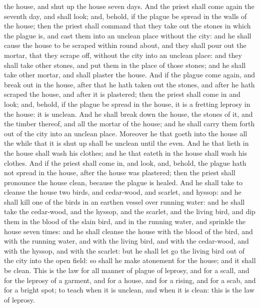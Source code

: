 the house, and shut up the house seven days. And the priest shall come again the seventh day, and shall look; and, behold, if the plague be spread in the walls of the house; then the priest shall command that they take out the stones in which the plague is, and cast them into an unclean place without the city: and he shall cause the house to be scraped within round about, and they shall pour out the mortar, that they scrape off, without the city into an unclean place: and they shall take other stones, and put them in the place of those stones; and he shall take other mortar, and shall plaster the house.  And if the plague come again, and break out in the house, after that he hath taken out the stones, and after he hath scraped the house, and after it is plastered; then the priest shall come in and look; and, behold, if the plague be spread in the house, it is a fretting leprosy in the house: it is unclean. And he shall break down the house, the stones of it, and the timber thereof, and all the mortar of the house; and he shall carry them forth out of the city into an unclean place. Moreover he that goeth into the house all the while that it is shut up shall be unclean until the even. And he that lieth in the house shall wash his clothes; and he that eateth in the house shall wash his clothes.  And if the priest shall come in, and look, and, behold, the plague hath not spread in the house, after the house was plastered; then the priest shall pronounce the house clean, because the plague is healed. And he shall take to cleanse the house two birds, and cedar-wood, and scarlet, and hyssop: and he shall kill one of the birds in an earthen vessel over running water: and he shall take the cedar-wood, and the hyssop, and the scarlet, and the living bird, and dip them in the blood of the slain bird, and in the running water, and sprinkle the house seven times: and he shall cleanse the house with the blood of the bird, and with the running water, and with the living bird, and with the cedar-wood, and with the hyssop, and with the scarlet: but he shall let go the living bird out of the city into the open field: so shall he make atonement for the house; and it shall be clean.  This is the law for all manner of plague of leprosy, and for a scall, and for the leprosy of a garment, and for a house, and for a rising, and for a scab, and for a bright spot; to teach when it is unclean, and when it is clean: this is the law of leprosy. 

